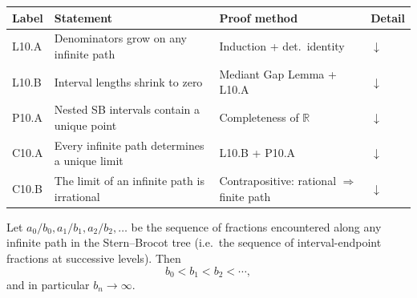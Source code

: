 

\begin{tcolorbox}[colback=gray!6, colframe=gray!40, arc=2pt,
  left=6pt, right=6pt, top=4pt, bottom=4pt,
  title={\small\textbf{Stern–Brocot Limit Theory — Quick Reference}},
  fonttitle=\small\bfseries]
\small
\begin{tabular}{l l l l}
\toprule
\textbf{Label} & \textbf{Statement} & \textbf{Proof method} & \textbf{Detail} \\
\midrule
L10.A & Denominators grow on any infinite path        & Induction + det.\ identity      & \hyperref[lem:sb-denom-growth]{$\downarrow$} \\
L10.B & Interval lengths shrink to zero               & Mediant Gap Lemma + L10.A       & \hyperref[lem:sb-length-zero]{$\downarrow$} \\
P10.A & Nested SB intervals contain a unique point    & Completeness of $\mathbb{R}$    & \hyperref[prop:sb-unique-point]{$\downarrow$} \\
C10.A & Every infinite path determines a unique limit & L10.B + P10.A                   & \hyperref[cor:sb-path-limit]{$\downarrow$} \\
C10.B & The limit of an infinite path is irrational   & Contrapositive: rational $\Rightarrow$ finite path & \hyperref[cor:sb-limit-irrational]{$\downarrow$} \\
\bottomrule
\end{tabular}
\end{tcolorbox}


\begin{lemma}
\label{lem:sb-denom-growth}
Let $a_0/b_0, a_1/b_1, a_2/b_2, \ldots$ be the sequence of fractions
encountered along any infinite path in the Stern--Brocot tree (i.e.\ the
sequence of interval-endpoint fractions at successive levels). Then
\[
  b_0 < b_1 < b_2 < \cdots,
\]
and in particular $b_n \to \infty$.
\end{lemma}

